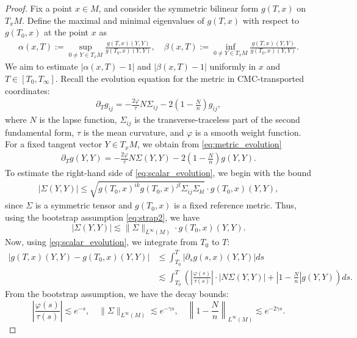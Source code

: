 \documentclass{amsart}
\begin{document}
\begin{proof}
Fix a point $x \in M$, and consider the symmetric bilinear form $g(T,x)$ on $T_x M$. Define the maximal and minimal eigenvalues of $g(T,x)$ with respect to $g(T_0,x)$ at the point $x$ as
\begin{align}
\label{eq:eigdef}
\alpha(x,T) := \sup_{0 \neq Y \in T_x M} \frac{g(T,x)(Y,Y)}{g(T_0,x)(Y,Y)}, \quad
\beta(x,T) := \inf_{0 \neq Y \in T_x M} \frac{g(T,x)(Y,Y)}{g(T_0,x)(Y,Y)}.
\end{align}
We aim to estimate $|\alpha(x,T)-1|$ and $|\beta(x,T)-1|$ uniformly in $x$ and $T \in [T_0,T_\infty]$.
Recall the evolution equation for the metric in CMC-transported coordinates:
\begin{align}
\label{eq:metric_evolution}
\partial_T g_{ij} = -\frac{2 \varphi}{\tau} N \Sigma_{ij} - 2\left(1 - \frac{N}{n}\right) g_{ij},
\end{align}
where $N$ is the lapse function, $\Sigma_{ij}$ is the transverse-traceless part of the second fundamental form, $\tau$ is the mean curvature, and $\varphi$ is a smooth weight function. For a fixed tangent vector $Y \in T_x M$, we obtain from \eqref{eq:metric_evolution}
\begin{align}
\label{eq:scalar_evolution}
\partial_T g(Y,Y) = -\frac{2\varphi}{\tau} N \Sigma(Y,Y) - 2\left(1 - \frac{N}{n} \right) g(Y,Y).
\end{align}
To estimate the right-hand side of \eqref{eq:scalar_evolution}, we begin with the bound
\begin{align}
\label{eq:sigma_pointwise}
|\Sigma(Y,Y)| \leq \sqrt{g(T_0,x)^{ik} g(T_0,x)^{jl} \Sigma_{ij} \Sigma_{kl}} \cdot g(T_0,x)(Y,Y),
\end{align}
since $\Sigma$ is a symmetric tensor and $g(T_0,x)$ is a fixed reference metric. Thus, using the bootstrap assumption \eqref{eq:strap2}, we have
\[
|\Sigma(Y,Y)| \lesssim \|\Sigma\|_{L^\infty(M)} \cdot g(T_0,x)(Y,Y).
\]
Now, using \eqref{eq:scalar_evolution}, we integrate from $T_0$ to $T$:
\begin{align}
|g(T,x)(Y,Y) - g(T_0,x)(Y,Y)| &\leq \int_{T_0}^T \left| \partial_s g(s,x)(Y,Y) \right| ds \\
&\lesssim \int_{T_0}^T \left( \left|\frac{\varphi(s)}{\tau(s)}\right| \cdot |N \Sigma(Y,Y)| + \left|1 - \frac{N}{n}\right| g(Y,Y) \right) ds.
\end{align}
From the bootstrap assumption, we have the decay bounds:
\[
\left| \frac{\varphi(s)}{\tau(s)} \right| \lesssim e^{-s}, \quad \|\Sigma\|_{L^\infty(M)} \lesssim e^{-\gamma s}, \quad \left\| 1 - \frac{N}{n} \right\|_{L^\infty(M)} \lesssim e^{-2\gamma s}.
\]
\end{proof}
\end{document}
